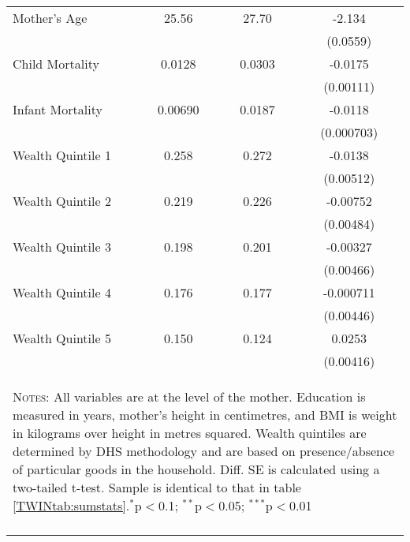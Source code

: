 \begin{table}[htbp]
\begin{tabular}{l*{1}{ccc}}
Mother's Age        &       25.56&       27.70&      -2.134\sym{***}\\
                    &            &            &    (0.0559)         \\
Child Mortality     &      0.0128&      0.0303&     -0.0175\sym{***}\\
                    &            &            &   (0.00111)         \\
Infant Mortality    &     0.00690&      0.0187&     -0.0118\sym{***}\\
                    &            &            &  (0.000703)         \\
Wealth Quintile 1   &       0.258&       0.272&     -0.0138\sym{**} \\
                    &            &            &   (0.00512)         \\
Wealth Quintile 2   &       0.219&       0.226&    -0.00752         \\
                    &            &            &   (0.00484)         \\
Wealth Quintile 3   &       0.198&       0.201&    -0.00327         \\
                    &            &            &   (0.00466)         \\
Wealth Quintile 4   &       0.176&       0.177&   -0.000711         \\
                    &            &            &   (0.00446)         \\
Wealth Quintile 5   &       0.150&       0.124&      0.0253\sym{***}\\
                    &            &            &   (0.00416)         \\
\midrule\midrule


\multicolumn{4}{p{10.4cm}}{\begin{footnotesize}\textsc{Notes:} All variables are at the level of the mother.  Education is measured in years, mother's height in centimetres, and BMI is weight in kilograms over height in metres squared.  Wealth quintiles are determined by DHS methodology and are based on presence/absence of particular goods in the household. Diff. SE is calculated using a two-tailed t-test.  Sample is identical to that in table \ref{TWINtab:sumstats}.$^{*}$p$<$0.1; $^{**}$p$<$0.05; $^{***}$p$<$0.01\end{footnotesize}}
\\\bottomrule\normalsize\end{tabular}\end{table} 
